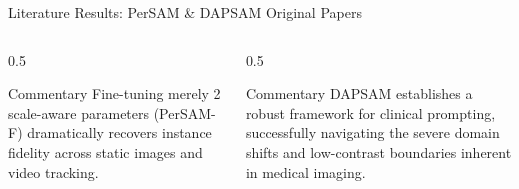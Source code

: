 \documentclass[aspectratio=169, 10pt]{beamer}
\begin{document}
\begin{frame}{Literature Results: PerSAM \& DAPSAM Original Papers}
    \begin{columns}[T]
        \begin{column}{0.5\textwidth}
            \begin{table}
                \caption{Personalized \& Video Segmentation \cite{zhang2024persam}}
            \end{table}
            \begin{alertblock}{Commentary}
                \footnotesize Fine-tuning merely 2 scale-aware parameters (PerSAM-F) dramatically recovers instance fidelity across static images and video tracking.
            \end{alertblock}
        \end{column}
        
        \begin{column}{0.5\textwidth}
            \begin{table}
                \caption{Domain Generalization on Medical Datasets \cite{wei2024prompting}}
            \end{table}
            \begin{alertblock}{Commentary}
                \footnotesize DAPSAM establishes a robust framework for clinical prompting, successfully navigating the severe domain shifts and low-contrast boundaries inherent in medical imaging.
            \end{alertblock}
        \end{column}
    \end{columns}
\end{frame}
\end{document}
